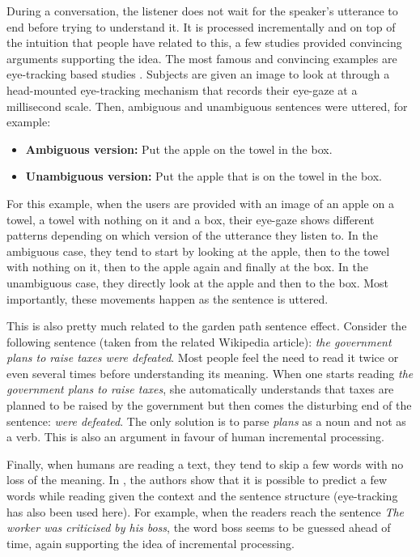            During a conversation, the listener does not wait for the speaker's utterance to end before trying to understand it. It is processed incrementally and on top of the intuition that people have related to this, a few studies provided convincing arguments supporting the idea. The most famous and convincing examples are eye-tracking based studies \cite{Tanenhaus1995,Eberhard1995,Arnold2000}. Subjects are given an image to look at through a head-mounted eye-tracking mechanism that records their eye-gaze at a millisecond scale. Then, ambiguous and unambiguous sentences were uttered, for example:

           \begin{itemize}
             \item \textbf{Ambiguous version:} Put the apple on the towel in the box.
             \item \textbf{Unambiguous version:} Put the apple that is on the towel in the box.
           \end{itemize}

           For this example, when the users are provided with an image of an apple on a towel, a towel with nothing on it and a box, their eye-gaze shows different patterns depending on which version of the utterance they listen to. In the ambiguous case, they tend to start by looking at the apple, then to the towel with nothing on it, then to the apple again and finally at the box. In the unambiguous case, they directly look at the apple and then to the box. Most importantly, these movements happen as the sentence is uttered.

           This is also pretty much related to the garden path sentence effect. Consider the following sentence (taken from the related Wikipedia article): \textit{the government plans to raise taxes were defeated}. Most people feel the need to read it twice or even several times before understanding its meaning. When one starts reading \textit{the government plans to raise taxes}, she automatically understands that taxes are planned to be raised by the government but then comes the disturbing end of the sentence: \textit{were defeated}. The only solution is to parse \textit{plans} as a noun and not as a verb. This is also an argument in favour of human incremental processing.

           Finally, when humans are reading a text, they tend to skip a few words with no loss of the meaning. In \cite{Ilkin2011}, the authors show that it is possible to predict a few words while reading given the context and the sentence structure (eye-tracking has also been used here). For example, when the readers reach the sentence \textit{The worker was criticised by his boss}, the word boss seems to be guessed ahead of time, again supporting the idea of incremental processing.


